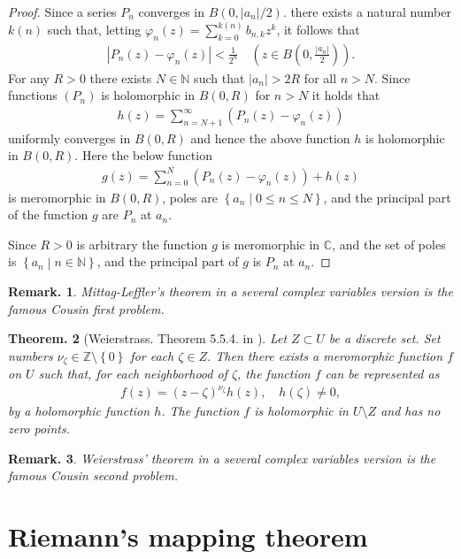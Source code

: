 \documentclass[openany, a4paper, oneside]{jsbook}
\theoremstyle{break}
\theoremstyle{breakdefn}
\newtheorem{thm}{Theorem.}[section]
\newtheorem{rem}[thm]{Remark.}
\newcommand{\abs}[1]{\left|#1\right|}
\newcommand{\rbk}[1]{\left (#1\right)}
\newcommand{\cbk}[1]{\left\{#1\right\}}
\newcommand{\relmiddle}[1]{\mathrel{}\middle#1\mathrel{}}
\newcommand{\set}[2]{\left\{#1 \relmiddle| #2\right\}}
\newcommand{\bbC}{\mathbb{C}}
\newcommand{\bbN}{\mathbb{N}}
\newcommand{\bbZ}{\mathbb{Z}}
\begin{document}
\begin{proof}
Since a series $P_n$ converges in $B (0, \abs{a_n} / 2)$.
there exists a natural number $k (n)$ such that, letting $\varphi_n (z) = \sum_{k=0}^{k (n)} b_{n, k}z^k$, it follows that
\begin{align}
 \abs{P_n (z) - \varphi_n (z)}  < \frac{1}{2^n} \quad \rbk{z \in B (0, \frac{\abs{a_n}}{2})}.
\end{align}
For any $R>0$ there exists $N \in \bbN$ such that $\abs{a_n} > 2R$ for all $n > N$.
Since functions $(P_n)$ is holomorphic in $B (0,R)$ for $n > N$ it holds that
\begin{align}
 h (z)
 =
 \sum_{n = N + 1}^{\infty} \rbk{P_n (z) - \varphi_n (z)}
\end{align}
uniformly converges in $B (0, R)$ and hence the above function $h$ is holomorphic in $B (0, R)$.
Here the below function
\begin{align}
 g (z)
 =
 \sum_{n=0}^N \rbk{P_n (z) - \varphi_n (z)} + h (z)
\end{align}
is meromorphic in $B (0, R)$, poles are $\set{a_n}{0 \leq n \leq N}$,
and the principal part of the function $g$ are $P_n$ at $a_n$.

Since $R > 0$ is arbitrary the function $g$ is meromorphic in $\bbC$,
and the set of poles is $\set{a_n}{n \in \bbN}$,
and the principal part of $g$ is $P_n$ at $a_n$.
\end{proof}
\begin{rem}
 Mittag-Leffler's theorem in a several complex variables version is the famous Cousin first problem.
\end{rem}

\begin{thm}[Weierstrass. Theorem 5.5.4. in \cite{JunjiroNoguchi1}]
 Let $Z \subset U$ be a discrete set.
 Set numbers $\nu_{\zeta} \in \bbZ \setminus \cbk{0}$ for each $\zeta \in Z$.
 Then there exists a meromorphic function $f$ on $U$ such that, for each neighborhood of $\zeta$,
 the function $f$ can be represented as
 \begin{align}
  f (z)
  =
  (z - \zeta)^{\nu_{\zeta}} h (z), \quad h (\zeta) \neq 0,
 \end{align}
 by a holomorphic function $h$.
 The function $f$ is holomorphic in $U \setminus Z$ and has no zero points.
\end{thm}
\begin{rem}
 Weierstrass' theorem in a several complex variables version is the famous Cousin second problem.
\end{rem}
\section{Riemann's mapping theorem}
\end{document}
